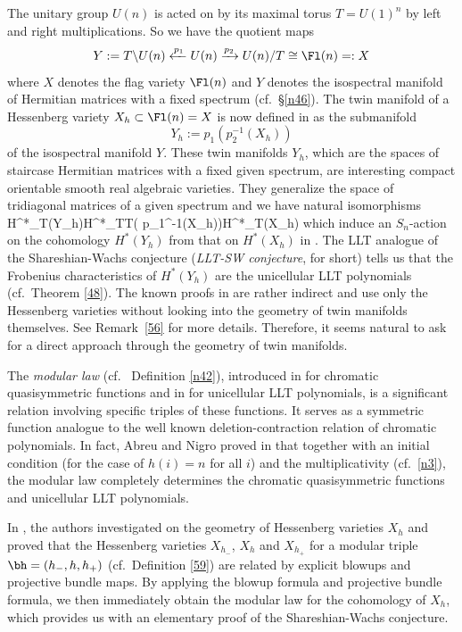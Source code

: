 The unitary group $U(n)$ is acted on by its maximal torus $T=U(1)^n$ by left and right multiplications. So we have the quotient maps 
$$Y:= T\backslash U(n) \xleftarrow{p_1}U(n)\xrightarrow{p_2}U(n)/T\cong \Fl(n)=:X$$
where $X$ denotes the flag variety $\Fl(n)$ and $Y$ denotes the isospectral manifold of Hermitian matrices with a fixed spectrum (cf.~\S\ref{n46}).  
The twin manifold of a Hessenberg variety $X_h\subset \Fl(n)=X$ is now defined in \cite{AB} as the submanifold $$Y_h:=p_1(p_2^{-1}(X_h))$$ of the isospectral manifold $Y$. 
These twin manifolds $Y_h$, which are the spaces of staircase Hermitian matrices with a fixed given spectrum, are interesting compact orientable smooth real algebraic varieties.
They generalize the space of tridiagonal matrices of a given spectrum \cite{Tom,BFR,DJ} and 
we have natural isomorphisms 
\beq\label{n47}
H^*_T(Y_h)\cong H^*_{T\times T}( p_1^{-1}(X_h))\cong H^*_T(X_h)\eeq 
which induce an $S_n$-action on the cohomology $H^*(Y_h)$ from that on $H^*(X_h)$ in \cite{Tym}.
The LLT analogue of the Shareshian-Wachs conjecture (\emph{LLT-SW conjecture}, for short) tells us that the Frobenius characteristics of $H^*(Y_h)$ are the unicellular LLT polynomials (cf.~Theorem \ref{48}). 
The known proofs in \cite{MS,PS} are rather indirect and use only  the Hessenberg varieties without looking into the geometry of twin manifolds themselves.
See Remark~\ref{56} for more details. 
Therefore, it seems natural to ask for a direct approach through the geometry of twin manifolds.  
 
The \emph{modular law} (cf.~ Definition \ref{n42}), introduced in \cite{AN, GP} for chromatic quasisymmetric functions and in \cite{Ale, Lee} for unicellular LLT polynomials, is a significant relation involving specific triples of these functions. It serves as a symmetric function analogue to the well known deletion-contraction relation of chromatic polynomials.
In fact, Abreu and Nigro proved in \cite{AN} that together with an initial condition (for the case of $h(i)=n$ for all $i$) and the multiplicativity (cf.~\eqref{n3}), 
the modular law completely determines the chromatic quasisymmetric functions and unicellular LLT polynomials. 

In \cite{KL}, the authors investigated on the geometry of Hessenberg varieties $X_h$ and proved that 
the Hessenberg varieties $X_{h_-}$, $X_{h}$ and $X_{h_+}$ for a modular triple $\bh=(h_-,h,h_+)$ (cf.~Definition \ref{59}) are related by explicit blowups and projective bundle maps. 
By applying the blowup formula and projective bundle formula, we then immediately obtain
the modular law for the cohomology of $X_h$, which provides us with an elementary proof of the Shareshian-Wachs conjecture. 

